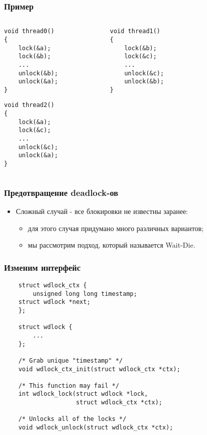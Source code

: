 \begin{frame}[fragile]
\frametitle{Пример}
\begin{columns}
    \begin{column}{.35\linewidth}
        \begin{lstlisting}
void thread0()
{
    lock(&a);
    lock(&b);
    ...
    unlock(&b);
    unlock(&a);
}
        \end{lstlisting}
        \begin{lstlisting}
void thread2()
{
    lock(&a);
    lock(&c);
    ...
    unlock(&c);
    unlock(&a);
}
        \end{lstlisting}
    \end{column}
    \begin{column}{.35\linewidth}
        \begin{lstlisting}
void thread1()
{
    lock(&b);
    lock(&c);
    ...
    unlock(&c);
    unlock(&b);
}
        \end{lstlisting}
    \end{column}
    \begin{column}{.3\linewidth}
    \end{column}
\end{columns}
\end{frame}

\begin{frame}
\frametitle{Предотвращение deadlock-ов}
\begin{itemize}
    \item<1->Сложный случай - все блокировки не известны заранее:
    \begin{itemize}
        \item<2->для этого случая придумано много различных вариантов;
        \item<3->мы рассмотрим подход, который называется Wait-Die.
    \end{itemize}
\end{itemize}
\end{frame}

\begin{frame}[fragile]
\frametitle{Изменим интерфейс}
\begin{lstlisting}
    struct wdlock_ctx {
        unsigned long long timestamp;
	struct wdlock *next;
    };

    struct wdlock {
        ...
    };

    /* Grab unique "timestamp" */
    void wdlock_ctx_init(struct wdlock_ctx *ctx);

    /* This function may fail */
    int wdlock_lock(struct wdlock *lock,
                    struct wdlock_ctx *ctx);

    /* Unlocks all of the locks */
    void wdlock_unlock(struct wdlock_ctx *ctx);
\end{lstlisting}
\end{frame}

